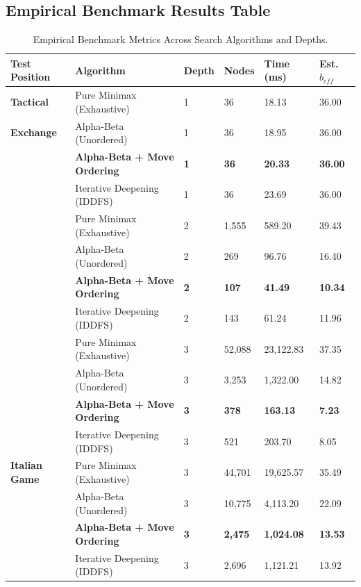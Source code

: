 \documentclass[11pt,a4paper]{article}
\begin{document}
\subsection{Empirical Benchmark Results Table}
\begin{table}[H]
\centering
\caption{Empirical Benchmark Metrics Across Search Algorithms and Depths.}
\label{tab:benchmark_results}
\small
\renewcommand{\arraystretch}{1.2}
\begin{tabularx}{\textwidth}{@{} L{2.5cm} Y C{1.12cm} R{1.6cm} R{1.6cm} R{1.6cm} @{}}
\toprule
\textbf{Test Position} & \textbf{Algorithm} & \textbf{Depth} & \textbf{Nodes} & \textbf{Time (ms)} & \textbf{Est. $b_{eff}$} \\
\midrule
\textbf{Tactical} & Pure Minimax (Exhaustive) & 1 & 36 & 18.13 & 36.00 \\
\textbf{Exchange} & Alpha-Beta (Unordered) & 1 & 36 & 18.95 & 36.00 \\
& \textbf{Alpha-Beta + Move Ordering} & \textbf{1} & \textbf{36} & \textbf{20.33} & \textbf{36.00} \\
& Iterative Deepening (IDDFS) & 1 & 36 & 23.69 & 36.00 \\
& Pure Minimax (Exhaustive) & 2 & 1,555 & 589.20 & 39.43 \\
& Alpha-Beta (Unordered) & 2 & 269 & 96.76 & 16.40 \\
& \textbf{Alpha-Beta + Move Ordering} & \textbf{2} & \textbf{107} & \textbf{41.49} & \textbf{10.34} \\
& Iterative Deepening (IDDFS) & 2 & 143 & 61.24 & 11.96 \\
& Pure Minimax (Exhaustive) & 3 & 52,088 & 23,122.83 & 37.35 \\
& Alpha-Beta (Unordered) & 3 & 3,253 & 1,322.00 & 14.82 \\
& \textbf{Alpha-Beta + Move Ordering} & \textbf{3} & \textbf{378} & \textbf{163.13} & \textbf{7.23} \\
& Iterative Deepening (IDDFS) & 3 & 521 & 203.70 & 8.05 \\
\midrule
\textbf{Italian Game} & Pure Minimax (Exhaustive) & 3 & 44,701 & 19,625.57 & 35.49 \\
& Alpha-Beta (Unordered) & 3 & 10,775 & 4,113.20 & 22.09 \\
& \textbf{Alpha-Beta + Move Ordering} & \textbf{3} & \textbf{2,475} & \textbf{1,024.08} & \textbf{13.53} \\
& Iterative Deepening (IDDFS) & 3 & 2,696 & 1,121.21 & 13.92 \\
\bottomrule
\end{tabularx}
\end{table}
\end{document}
